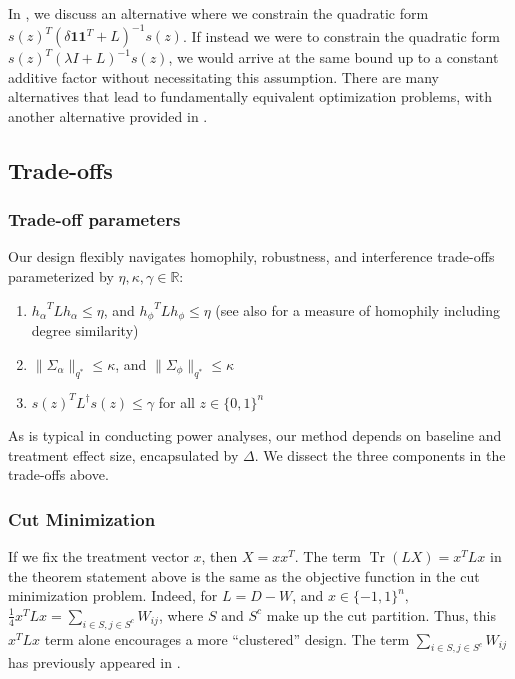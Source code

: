 \documentclass[12pt]{article}
\theoremstyle{definition}
\numberwithin{equation}{section}
\numberwithin{figure}{section}
\numberwithin{equation}{section}
\numberwithin{figure}{section}
\begin{document}
In , we discuss an alternative where we constrain the quadratic form $s(z)^T (\delta \mathbf{1}\mathbf{1}^T +L)^{-1} s(z)$. If instead we were to constrain the quadratic form $s(z)^T (\lambda I +L)^{-1} s(z)$, we would arrive at the same bound up to a constant additive factor without necessitating this assumption. There are many alternatives that lead to fundamentally equivalent optimization problems, with another alternative provided in .

\subsection{Trade-offs} \label{model_class_tradeoffs}

\subsubsection*{Trade-off parameters} \label{assumptions}
Our design flexibly navigates homophily, robustness, and interference trade-offs parameterized by $\eta, \kappa, \gamma \in \mathbb{R}$:
\begin{enumerate} 
    \item ${h_{\alpha}}^T L h_{\alpha} \leq \eta$, and ${h_{\phi}}^T L h_{\phi} \leq \eta$ (see also  for a measure of homophily including degree similarity)
    \item $\| \Sigma_\alpha \|_{q^*} \leq \kappa$,  and $\|\Sigma_\phi\|_{q^*} \leq \kappa$
    \item $s(z)^T L^{\dagger} s(z) \leq \gamma$ for all $z \in \{ 0,1\}^n$
\end{enumerate}

As is typical in conducting power analyses, our method depends on baseline and treatment effect size, encapsulated by $\Delta$. We dissect the three components in the trade-offs above. 

\subsubsection{Cut Minimization}
If we fix the treatment vector $x$, then $X = xx^T$. The term $\operatorname{Tr}(LX) = x^T L x$ in the theorem statement above is the same as the objective function in the cut minimization problem. Indeed, for $L = D- W$, and $x \in \{-1, 1 \}^n,$ $\frac{1}{4} x^T L x =  \sum_{i \in S, j\in S^c}  W_{ij}$,
where $S$ and $S^c$ make up the cut partition. Thus, this $x^T L x$ term alone encourages a more ``clustered'' design. The term $\sum_{i \in S, j\in S^c}  W_{ij}$ has previously appeared in \citet{brennan2022cluster, viviano2023causal}.
\end{document}
